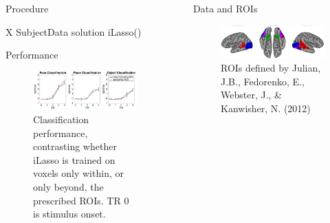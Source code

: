 \documentclass[final]{beamer}
\newlength{\sepwid}
\newlength{\introcolwid}
\begin{document}
\begin{frame}[t]
\begin{columns}[t]
\begin{column}{\introcolwid}
   		\begin{block}{Procedure}
				\begin{algorithmic}
						X \gets SubjectData
								solution \gets iLasso()				
							\EndFor
						\EndFor
					\EndFor
				\end{algorithmic}
  		\end{block}
  		\begin{block}{Performance}
			\begin{figure}
				\includegraphics[width=\textwidth]{figures/Summary_by_TR.png}
				\caption{Classification performance, contrasting whether iLasso is trained on voxels only within, or only beyond, the prescribed ROIs. TR 0 is stimulus onset.}
			\end{figure}			
  		\end{block}
   	\end{column}

    \begin{column}{\sepwid}\end{column}			%
    \begin{column}{\introcolwid}					  %
		\begin{block}{Data and ROIs}
			\begin{figure}
				\includegraphics[width=\textwidth]{figures/ROIs.png}
				\caption{ROIs defined by Julian, J.B., Fedorenko, E., Webster, J., \& Kanwisher, N. (2012)}
			\end{figure}
		\end{block}
		

\end{column}
\end{columns}
\end{frame}
\end{document}
